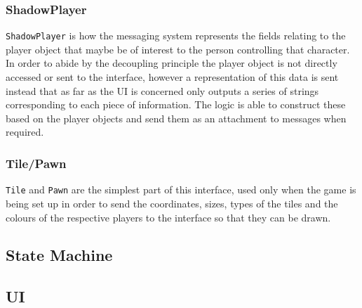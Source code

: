 \documentclass[a4paper, 11pt]{article}
\begin{document}
	\subsubsection*{ShadowPlayer}
	\texttt{ShadowPlayer} is how the messaging system represents the fields relating to the player object that maybe be of interest to the person controlling that character. In order to abide by the decoupling principle the player object is not directly accessed or sent to the interface, however a representation of this data is sent instead that as far as the UI is concerned only outputs a series of strings corresponding to each piece of information. The logic is able to construct these based on the player objects and send them as an attachment to messages when required.
	\subsubsection*{Tile/Pawn}
	\texttt{Tile} and \texttt{Pawn} are the simplest part of this interface, used only when the game is being set up in order to send the coordinates, sizes, types of the tiles and the colours of the respective players to the interface so that they can be drawn.
	
	\subsection*{State Machine}
	\subsection*{UI}
	
\end{document}
